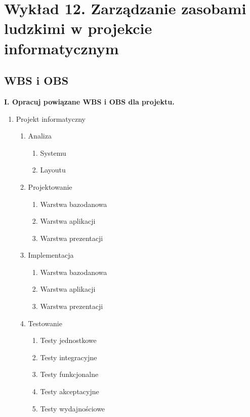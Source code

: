 ﻿\chapter{Wykład 12. Zarządzanie zasobami ludzkimi w projekcie informatycznym}

\section{WBS i OBS}

\textbf{I. Opracuj powiązane WBS i OBS dla projektu.}

\begin{enumerate}
\item Projekt informatyczny

\begin{enumerate}

\item Analiza

\begin{enumerate}

\item Systemu
\item Layoutu

\end{enumerate}
\item Projektowanie

\begin{enumerate}

\item Warstwa bazodanowa
\item Warstwa aplikacji
\item Warstwa prezentacji

\end{enumerate}
\item Implementacja

\begin{enumerate}

\item Warstwa bazodanowa
\item Warstwa aplikacji
\item Warstwa prezentacji

\end{enumerate}
\item Testowanie

\begin{enumerate}

\item Testy jednostkowe
\item Testy integracyjne
\item Testy funkcjonalne
\item Testy akceptacyjne
\item Testy wydajnościowe


\end{enumerate}
\end{enumerate}
\end{enumerate}
